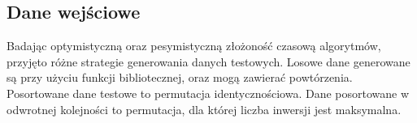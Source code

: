 \subsection{Dane wejściowe}
Badając optymistyczną oraz pesymistyczną złożoność czasową algorytmów, przyjęto różne strategie generowania danych testowych. Losowe dane generowane są przy użyciu funkcji bibliotecznej, oraz mogą zawierać powtórzenia. Posortowane dane testowe to permutacja identycznościowa. Dane posortowane w odwrotnej kolejności to permutacja, dla której liczba inwersji jest maksymalna.\\
